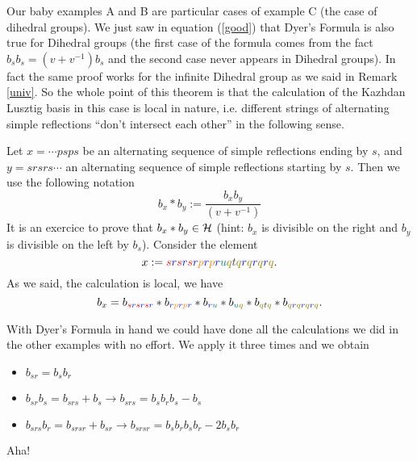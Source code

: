 \documentclass[12pt]{wart}
\theoremstyle{remark}
\begin{document}
Our baby examples A and B are particular cases of example C (the case of dihedral groups). We just saw in equation (\ref{good}) that Dyer's Formula is also true for Dihedral groups (the first case of the formula comes from the fact $b_sb_s=(v+v^{-1})b_s$ and the second case never appears in Dihedral groups). In fact the same proof works for the infinite Dihedral group as we said in Remark \ref{univ}. So the whole point of this theorem is that the calculation of the Kazhdan Lusztig basis in this case is local in nature, i.e. different strings of alternating simple reflections ``don't intersect each other'' in the following sense. 


Let $x=\cdots psps$ be an alternating sequence of simple reflections ending by $s$, and $y=srsrs\cdots$ an alternating sequence of simple reflections starting by $s$. Then we use the following notation
$$b_x\ast b_y:= \frac{b_xb_y}{(v+v^{-1})}$$
It is an exercice to prove that $b_x\ast b_y\in \mathcal H$ (hint: $b_x$ is divisible on the right and $b_y$ is  divisible on the left by $b_s$).     Consider the element $$x:={\color{red}s}{\color{blue}r}{\color{red}s}{\color{blue}r}{\color{red}s}{\color{blue}r}{\color{orange} p}{\color{blue}r}{\color{orange} p}{\color{blue}r}{\color{teal} u}{\color{olive}q}{\color{darkgray} t}{\color{olive}q} {\color{blue}r}{\color{olive}q}{\color{blue}r}{\color{olive}q}{\color{blue}r}{\color{olive}q}.$$ 
As we said, the calculation is local, we have
 $$ b_x=b_{{\color{red}s}{\color{blue}r}{\color{red}s}{\color{blue}r}{\color{red}s}{\color{blue}r}}\ast b_{{\color{blue}r}{\color{orange} p}{\color{blue}r}{\color{orange} p}{\color{blue}r}}\ast b_{{\color{blue}r}{\color{teal} u}}\ast b_{{\color{teal} u}{\color{olive}q}} \ast b_{{\color{olive}q}{\color{darkgray} t}{\color{olive}q}}\ast b_{{\color{olive}q}{\color{blue}r}{\color{olive}q}{\color{blue}r}{\color{olive}q}{\color{blue}r}{\color{olive}q}}.$$




 With Dyer's Formula in hand we could have done all the calculations we did in the other examples with no effort. We apply it three times and we obtain
\begin{itemize}
\item $b_{sr}=b_sb_r$ 
\item$b_{sr}b_s=b_{srs}+b_s \longrightarrow b_{srs}=b_{s}b_rb_s-b_s$ 
\item $b_{srs}b_r=b_{srsr}+b_{sr} \longrightarrow  b_{srsr}=b_sb_rb_sb_r-2b_sb_r$
\end{itemize}
\hspace{10cm}Aha!
\end{document}
